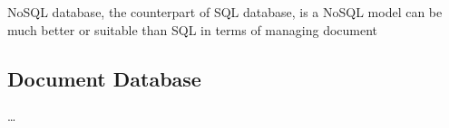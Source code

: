 \ac{NoSQL} database, the counterpart of \ac{SQL} database, is a
NoSQL model can be much better or suitable than SQL in terms of managing document


\subsection{Document Database}

\ldots


